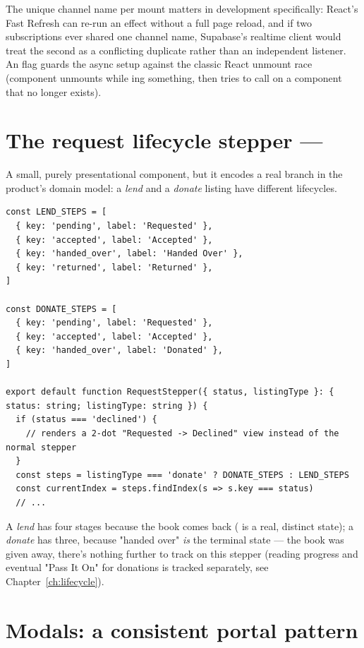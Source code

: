 The unique channel name per mount matters in development specifically: React's Fast Refresh can re-run an effect without a full page reload, and if two subscriptions ever shared one channel name, Supabase's realtime client would treat the second  as a conflicting duplicate rather than an independent listener. An  flag guards the async setup against the classic React unmount race (component unmounts while ing something, then tries to call  on a component that no longer exists).

\section{The request lifecycle stepper — }

A small, purely presentational component, but it encodes a real branch in the product's domain model: a \emph{lend} and a \emph{donate} listing have different lifecycles.

\begin{lstlisting}[caption={Two different step lists, and a short-circuit for the third outcome}]
const LEND_STEPS = [
  { key: 'pending', label: 'Requested' },
  { key: 'accepted', label: 'Accepted' },
  { key: 'handed_over', label: 'Handed Over' },
  { key: 'returned', label: 'Returned' },
]

const DONATE_STEPS = [
  { key: 'pending', label: 'Requested' },
  { key: 'accepted', label: 'Accepted' },
  { key: 'handed_over', label: 'Donated' },
]

export default function RequestStepper({ status, listingType }: { status: string; listingType: string }) {
  if (status === 'declined') {
    // renders a 2-dot "Requested -> Declined" view instead of the normal stepper
  }
  const steps = listingType === 'donate' ? DONATE_STEPS : LEND_STEPS
  const currentIndex = steps.findIndex(s => s.key === status)
  // ...
\end{lstlisting}

A \emph{lend} has four stages because the book comes back ( is a real, distinct state); a \emph{donate} has three, because "handed over" \emph{is} the terminal state — the book was given away, there's nothing further to track on this stepper (reading progress and eventual "Pass It On" for donations is tracked separately, see Chapter~\ref{ch:lifecycle}).

\section{Modals: a consistent portal pattern}


